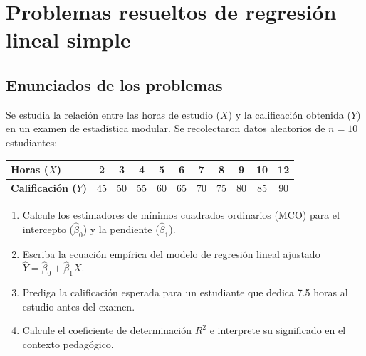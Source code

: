 \section{Problemas resueltos de regresión lineal simple}

\subsection*{Enunciados de los problemas}

\begin{problema}
	\label{prob:ab5bf4a}
	Se estudia la relación entre las horas de estudio ($X$) y la calificación obtenida ($Y$) en un examen de estadística modular. Se recolectaron datos aleatorios de $n = 10$ estudiantes:
	\begin{center}
		\begin{tabular}{|l|c|c|c|c|c|c|c|c|c|c|}\hline
			\textbf{Horas ($X$)} & 2 & 3 & 4 & 5 & 6 & 7 & 8 & 9 & 10 & 12 \\\hline
			\textbf{Calificación ($Y$)} & 45 & 50 & 55 & 60 & 65 & 70 & 75 & 80 & 85 & 90 \\\hline
		\end{tabular}
	\end{center}
	\begin{enumerate}
		\item Calcule los estimadores de mínimos cuadrados ordinarios (MCO) para el intercepto ($\hat{\beta}_0$) y la pendiente ($\hat{\beta}_1$).
		\item Escriba la ecuación empírica del modelo de regresión lineal ajustado $\hat{Y} = \hat{\beta}_0 + \hat{\beta}_1 X$.
		\item Prediga la calificación esperada para un estudiante que dedica 7.5 horas al estudio antes del examen.
		\item Calcule el coeficiente de determinación $R^2$ e interprete su significado en el contexto pedagógico.
	\end{enumerate}
\end{problema}

